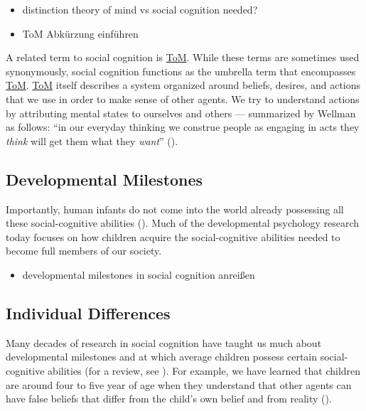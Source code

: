 \documentclass[
]{scrbook}
\providecommand{\tightlist}{%
  \setlength{\itemsep}{0pt}\setlength{\parskip}{0pt}}
\begin{document}
\begin{itemize}
\tightlist
\item
  distinction theory of mind vs social cognition needed?
\item
  ToM Abkürzung einführen
\end{itemize}

A related term to social cognition is \hyperref[acronyms_ToM]{ToM}. While these terms are sometimes used synonymously, social cognition functions as the umbrella term that encompasses \hyperref[acronyms_ToM]{ToM}. \hyperref[acronyms_ToM]{ToM} itself describes a system organized around beliefs, desires, and actions that we use in order to make sense of other agents. We try to understand actions by attributing mental states to ourselves and others --- summarized by Wellman as follows: ``in our everyday thinking we construe people as engaging in acts they \emph{think} will get them what they \emph{want}'' ().

\subsection{Developmental Milestones}\label{developmental-milestones}

Importantly, human infants do not come into the world already possessing all these social-cognitive abilities (). Much of the developmental psychology research today focuses on how children acquire the social-cognitive abilities needed to become full members of our society.

\begin{itemize}
\tightlist
\item
  developmental milestones in social cognition anreißen
\end{itemize}

\subsection{Individual Differences}\label{individual-differences}

Many decades of research in social cognition have taught us much about developmental milestones and at which average children possess certain social-cognitive abilities (for a review, see ). For example, we have learned that children are around four to five year of age when they understand that other agents can have false beliefs that differ from the child's own belief and from reality ().
\end{document}
